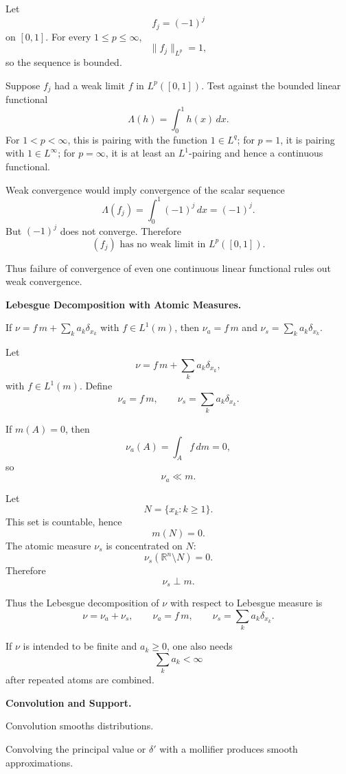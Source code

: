 \begin{solution}
Let
\[
f_j=(-1)^j
\]
on \([0,1]\). For every \(1\le p\le\infty\),
\[
\|f_j\|_{L^p}=1,
\]
so the sequence is bounded.

Suppose \(f_j\) had a weak limit \(f\) in \(L^p([0,1])\). Test against the bounded linear
functional
\[
\Lambda(h)=\int_0^1 h(x)\,dx.
\]
For \(1<p<\infty\), this is pairing with the function \(1\in L^q\); for \(p=1\), it is
pairing with \(1\in L^\infty\); for \(p=\infty\), it is at least an \(L^1\)-pairing and hence
a continuous functional.

Weak convergence would imply convergence of the scalar sequence
\[
\Lambda(f_j)
=
\int_0^1(-1)^j\,dx
=
(-1)^j.
\]
But \((-1)^j\) does not converge. Therefore
\[
\boxed{
(f_j)\text{ has no weak limit in }L^p([0,1]).
}
\]

Thus failure of convergence of even one continuous linear functional rules out weak
convergence.
\end{solution}


\begin{problem}[CP-II-0195]
\label{prob:cp-ii-0195}
\textbf{Lebesgue Decomposition with Atomic Measures.}

\hspace*{1.5em}If \(\nu=f\,m+\sum_{k} a_k\delta_{x_k}\) with \(f\in L^1(m)\), then
		\(\nu_a=f\,m\) and \(\nu_s=\sum_{k} a_k\delta_{x_k}\).
\end{problem}

\begin{solution}
Let
\[
\nu
=
f\,m+\sum_k a_k\delta_{x_k},
\]
with \(f\in L^1(m)\). Define
\[
\nu_a=f\,m,
\qquad
\nu_s=\sum_k a_k\delta_{x_k}.
\]

If \(m(A)=0\), then
\[
\nu_a(A)
=
\int_A f\,dm
=
0,
\]
so
\[
\nu_a\ll m.
\]

Let
\[
N=\{x_k:k\ge1\}.
\]
This set is countable, hence
\[
m(N)=0.
\]
The atomic measure \(\nu_s\) is concentrated on \(N\):
\[
\nu_s(\mathbb R^n\setminus N)=0.
\]
Therefore
\[
\nu_s\perp m.
\]

Thus the Lebesgue decomposition of \(\nu\) with respect to Lebesgue measure is
\[
\boxed{
\nu=\nu_a+\nu_s,
\qquad
\nu_a=f\,m,
\qquad
\nu_s=\sum_k a_k\delta_{x_k}.
}
\]

If \(\nu\) is intended to be finite and \(a_k\ge0\), one also needs
\[
\sum_k a_k<\infty
\]
after repeated atoms are combined.
\end{solution}


\begin{problem}[CP-II-0196]
\label{prob:cp-ii-0196}
\textbf{Convolution and Support.}

\hspace*{1.5em}Convolution smooths distributions.

Convolving the principal value or $\delta'$ with a mollifier produces
smooth approximations.
\end{problem}

